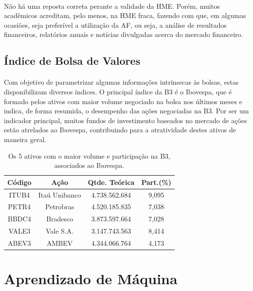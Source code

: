 \documentclass[grad,numbers]{coppe}
\begin{document}
 			\paragraph{}Não há uma reposta correta perante a validade da HME. Porém, muitos acadêmicos acreditam, pelo menos, na HME fraca\cite{emh-br}, fazendo com que, em algumas ocasiões, seja preferível a utilização da AF, ou seja, a análise de resultados financeiros, relatórios anuais e notícias divulgadas acerca do mercado financeiro.
 			
		\subsection{Índice de Bolsa de Valores}
			\paragraph{}Com objetivo de parametrizar algumas informações intrínsecas às bolsas, estas disponibilizam diversos índices. O principal índice da B3 é o Ibovespa, que é formado pelos ativos com maior volume negociado na bolsa nos últimos meses e indica, de forma resumida, o desempenho das ações negociadas na B3. Por ser um indicador principal, muitos fundos de investimento baseados no mercado de ações estão atrelados ao Ibovespa, contribuindo para a atratividade destes ativos de maneira geral.
			\begin{table}[h]
				\caption{Os 5 ativos com o maior volume e participação na B3, associados ao Ibovespa\cite{carteira-bovespa}.}
				\label{tab:ibovespa-5bigger}
				\centering
				{\footnotesize
					\begin{tabular}{|c|c|c|c|}
						\hline
						Código & Ação & Qtde. Teórica & Part.(\%)\\
						\hline
						ITUB4 &  Itaú Unibanco & 4.738.562.684 & 9,095 \\
						PETR4 &  Petrobras & 4.520.185.835 & 7,038 \\
						BBDC4 &  Bradesco & 3.873.597.664 & 7,028 \\
						VALE3 &  Vale S.A. & 3.147.743.563 & 8,414 \\
						ABEV3 &  AMBEV & 4.344.066.764 & 4,173 \\
						\hline
				\end{tabular}}
			\end{table}
			 
  \section{Aprendizado de Máquina}
\end{document}
